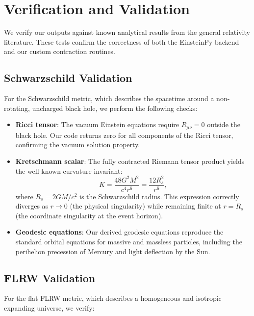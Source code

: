 \documentclass[11pt,a4paper]{article}
\begin{document}
\section{Verification and Validation}

We verify our outputs against known analytical results from the general relativity literature. These tests confirm the correctness of both the EinsteinPy backend and our custom contraction routines.

\subsection{Schwarzschild Validation}

For the Schwarzschild metric, which describes the spacetime around a non-rotating, uncharged black hole, we perform the following checks:

\begin{itemize}
    \item \textbf{Ricci tensor}: The vacuum Einstein equations require $R_{\mu\nu} = 0$ outside the black hole. Our code returns zero for all components of the Ricci tensor, confirming the vacuum solution property.
    
    \item \textbf{Kretschmann scalar}: The fully contracted Riemann tensor product yields the well-known curvature invariant:
    \begin{equation}
    K = \frac{48 G^2 M^2}{c^4 r^6} = \frac{12 R_s^2}{r^6},
    \end{equation}
    where $R_s = 2GM/c^2$ is the Schwarzschild radius. This expression correctly diverges as $r \to 0$ (the physical singularity) while remaining finite at $r = R_s$ (the coordinate singularity at the event horizon).
    
    \item \textbf{Geodesic equations}: Our derived geodesic equations reproduce the standard orbital equations for massive and massless particles, including the perihelion precession of Mercury and light deflection by the Sun.
\end{itemize}

\subsection{FLRW Validation}

For the flat FLRW metric, which describes a homogeneous and isotropic expanding universe, we verify:
\end{document}
